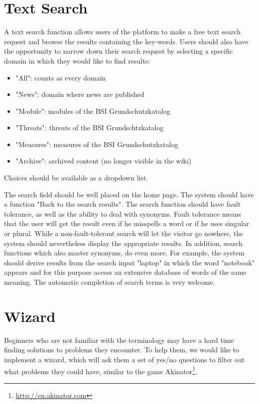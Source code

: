 \section{Text Search}
\label{search_function}
A text search function allows users of the platform to make a free text search request and browse the results containing the key-words. 
Users should also have the opportunity to narrow down their search request by selecting a specific domain in which they would like to find results:
\begin{itemize}
\item "All": counts as every domain
\item "News": domain where news are published
\item "Module": modules of the BSI Grundschutzkatalog
\item "Threats": threats of the BSI Grundschtzkatalog
\item "Measures": measures of the BSI Grundschutzkatalog
\item "Archive": archived content (no longer visible in the wiki)
\end{itemize}
 
Choices should be available as a dropdown list.
\bigskip

The search field should be well placed on the home page. 
The system should have a function "Back to the search results". 
The search function should have fault tolerance, as well as the ability to deal with synonyms. 
Fault tolerance means that the user will get the result even if he misspells a word or if he uses singular or plural. 
While a non-fault-tolerant search will let the visitor go nowhere, the system should nevertheless display the appropriate results.
In addition, search functions which also master synonyms, do even more. 
For example, the system should derive results from the search input "laptop" in which the word "notebook" appears and for this purpose access an extensive database of words of the same meaning. 
The automatic completion of search terms is very welcome.
  

\section{Wizard}
\label{wizard}
Beginners who are not familiar with the terminology may have a hard time finding solutions to problems they encounter. 
To help them, we would like to implement a wizard, which will ask them a set of yes/no questions to filter out what problems they could have, similar to the game Akinator\footnote{\url{http://en.akinator.com}}. 
 
